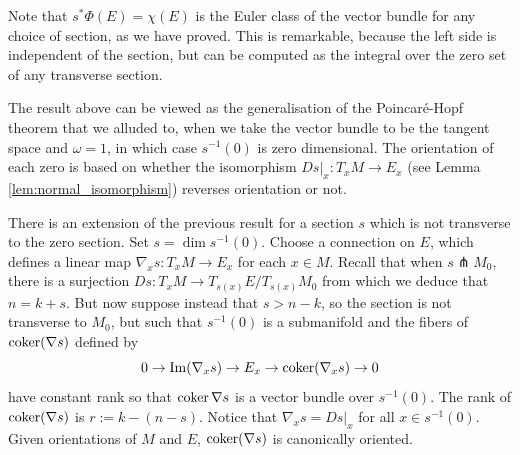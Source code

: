 Note that $s^*\Phi(E) = \chi(E)$ is the Euler class of the vector bundle for any
choice of section, as we have proved. This is remarkable, because the left side
is independent of the section, but can be computed as the integral over the zero
set of any transverse section.

The result above can be viewed as the generalisation of the Poincar\'e-Hopf
theorem that we alluded to, when we take the vector bundle to be the
tangent space and $\omega=1$, in which case $s^{-1}(0)$ is zero dimensional. 
The orientation of each zero is based on whether the isomorphism  $Ds|_x : T_xM \to E_x$ 
(see Lemma \ref{lem:normal_isomorphism}) reverses orientation or not.
 

There is an extension of the previous result for a section $s$ which is not
transverse to the zero section. Set $s= \dim s^{-1}(0)$. Choose a connection on
$E$, which defines a linear map $\nabla_x s : T_xM \to E_x$ for each  $x\in M$.
Recall that when $s \pitchfork M_0$, 
there is a surjection $Ds : T_x M \to T_{s(x)} E / T_{s(x)} M_0$ from which 
we deduce that $n = k + s$. 
But now suppose instead that  $s > n - k$, so
the section is not transverse to $M_0$, but such that $s^{-1}(0)$ is a
submanifold and the fibers of $\operatorname{coker} (\nabla s)$ defined by 
\[
0 \to {\operatorname{Im}}(\nabla_x s) \to E_x \to \operatorname{coker} (\nabla_x s) \to 0
\] 
have constant rank so that $\operatorname{coker} \nabla s$ is a vector bundle over  $s^{-1}(0)$.
The rank of $\operatorname{coker} (\nabla s)$ is $r := k-(n-s)$.
Notice that $\nabla_x s = Ds|_x$ for all  $x\in s^{-1}(0)$. 
Given orientations of  $M$ and  $E$, $\operatorname{coker}(\nabla s)$ is canonically oriented.


